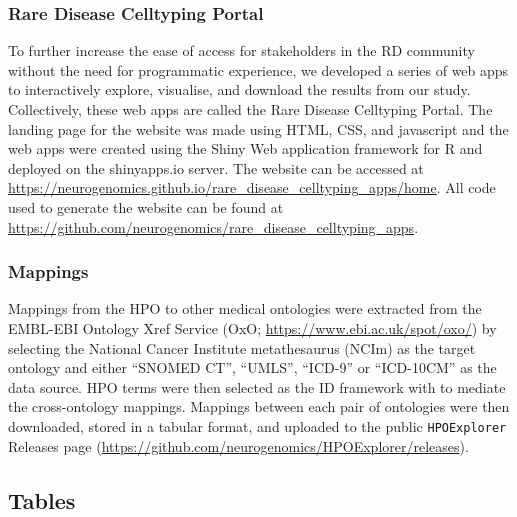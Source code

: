 \documentclass[
]{article}
\begin{document}
\subsubsection{Rare Disease Celltyping
Portal}\label{rare-disease-celltyping-portal}

To further increase the ease of access for stakeholders in the RD
community without the need for programmatic experience, we developed a
series of web apps to interactively explore, visualise, and download the
results from our study. Collectively, these web apps are called the Rare
Disease Celltyping Portal. The landing page for the website was made
using HTML, CSS, and javascript and the web apps were created using the
Shiny Web application framework for R and deployed on the shinyapps.io
server. The website can be accessed at
\url{https://neurogenomics.github.io/rare_disease_celltyping_apps/home}.
All code used to generate the website can be found at
\url{https://github.com/neurogenomics/rare_disease_celltyping_apps}.

\subsubsection{Mappings}\label{mappings-1}

Mappings from the HPO to other medical ontologies were extracted from
the EMBL-EBI Ontology Xref Service (OxO;
\url{https://www.ebi.ac.uk/spot/oxo/}) by selecting the National Cancer
Institute metathesaurus (NCIm) as the target ontology and either
``SNOMED CT'', ``UMLS'', ``ICD-9'' or ``ICD-10CM'' as the data source.
HPO terms were then selected as the ID framework with to mediate the
cross-ontology mappings. Mappings between each pair of ontologies were
then downloaded, stored in a tabular format, and uploaded to the public
\texttt{HPOExplorer} Releases page
(\url{https://github.com/neurogenomics/HPOExplorer/releases}).

\newpage{}

\subsection{Tables}\label{tables}
\end{document}

